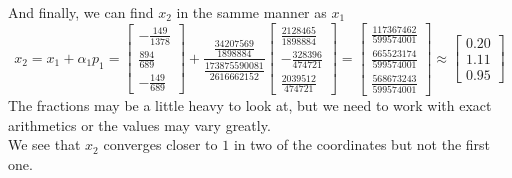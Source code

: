 \documentclass[12pt]{article}
\begin{document}
And finally, we can find $x_2$ in the samme manner as $x_1$
$$
x_2=x_1+\alpha_1p_1
=
\begin{bmatrix}
-\frac{149}{1378} \\
\frac{894}{689} \\
-\frac{149}{689}
\end{bmatrix}
+
\frac{\frac{34207569}{1898884}}{\frac{173875590081}{2616662152}}
\begin{bmatrix}
\frac{2128465}{1898884} \\
-\frac{328396}{474721} \\
\frac{2039512}{474721}
\end{bmatrix}
=
\begin{bmatrix}
\frac{117367462}{599574001} \\
\frac{665523174}{599574001} \\
\frac{568673243}{599574001}
\end{bmatrix}
\approx
\begin{bmatrix}
0.20 \\
1.11 \\
0.95
\end{bmatrix}
$$
The fractions may be a little heavy to look at, but we need to work with exact arithmetics or the values may vary greatly.\\
We see that $x_2$ converges closer to $1$ in two of the coordinates but not the first one.
\end{document}

